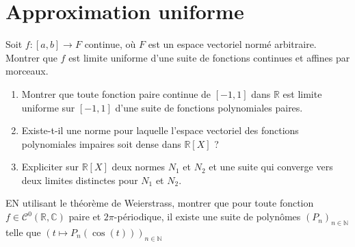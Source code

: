 \documentclass[french,a4paper]{article}
\newcommand{\N}{\mathbb{N}}
\newcommand{\R}{\mathbb{R}}
\newcommand{\C}{\mathbb{C}}
\theoremstyle{plain}
\theoremstyle{definition}
\theoremstyle{remark}
\begin{document}
\section{Approximation uniforme}

\begin{ex}{}
	Soit $f:[a,b]\to F$ continue, où $F$ est un espace vectoriel normé arbitraire. Montrer que $f$ est limite uniforme d'une suite de fonctions continues et affines par morceaux.
\end{ex}

\begin{ex}{}
	\begin{enumerate}
		\item Montrer que toute fonction paire continue de $[-1,1]$ dans $\R$ est limite uniforme sur $[-1,1]$ d'une suite de fonctions polynomiales paires.
		\item Existe-t-il une norme pour laquelle l'espace vectoriel des fonctions polynomiales impaires soit dense dans $\R[X]$ ?
		\item Expliciter sur $\R[X]$ deux normes $N_1$ et $N_2$ et une suite qui converge vers deux limites distinctes pour $N_1$ et $N_2$.
	\end{enumerate}
\end{ex}

\begin{ex}{}
	EN utilisant le théorème de Weierstrass, montrer que pour toute fonction $f\in\mathcal{C}^0(\R,\C)$ paire et $2\pi$-périodique, il existe une suite de polynômes $(P_n)_{n\in\N}$ telle que $(t\mapsto P_n(\cos(t)))_{n\in\N}$
\end{ex}
\end{document}
